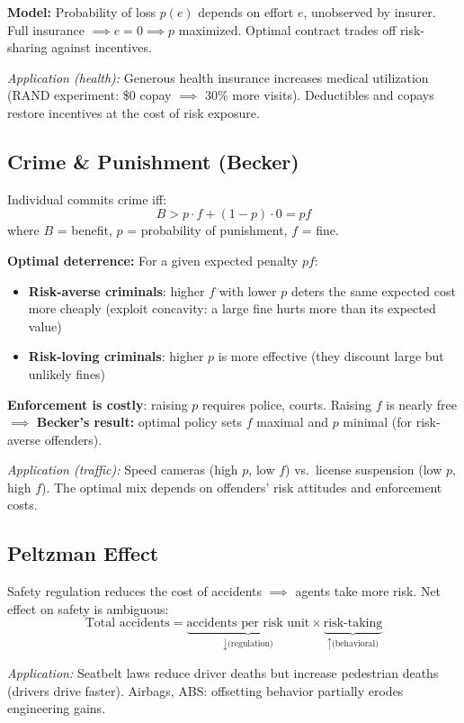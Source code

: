\textbf{Model:} Probability of loss $p(e)$ depends on effort $e$, unobserved by insurer. Full insurance $\implies e = 0 \implies p$ maximized. Optimal contract trades off risk-sharing against incentives.

\textit{Application (health):} Generous health insurance increases medical utilization (RAND experiment: \$0 copay $\implies$ 30\% more visits). Deductibles and copays restore incentives at the cost of risk exposure.

\subsection{Crime \& Punishment (Becker)}
Individual commits crime iff:
$$B > p \cdot f + (1-p) \cdot 0 = pf$$
where $B$ = benefit, $p$ = probability of punishment, $f$ = fine.

\textbf{Optimal deterrence:} For a given expected penalty $pf$:
\begin{itemize}[nosep]
  \item \textbf{Risk-averse criminals}: higher $f$ with lower $p$ deters the same expected cost more cheaply (exploit concavity: a large fine hurts more than its expected value)
  \item \textbf{Risk-loving criminals}: higher $p$ is more effective (they discount large but unlikely fines)
\end{itemize}
\textbf{Enforcement is costly}: raising $p$ requires police, courts. Raising $f$ is nearly free $\implies$ \textbf{Becker's result:} optimal policy sets $f$ maximal and $p$ minimal (for risk-averse offenders).

\textit{Application (traffic):} Speed cameras (high $p$, low $f$) vs.\ license suspension (low $p$, high $f$). The optimal mix depends on offenders' risk attitudes and enforcement costs.

\subsection{Peltzman Effect}
Safety regulation reduces the cost of accidents $\implies$ agents take more risk. Net effect on safety is ambiguous:
$$\text{Total accidents} = \underbrace{\text{accidents per risk unit}}_{\downarrow \text{(regulation)}} \times \underbrace{\text{risk-taking}}_{\uparrow \text{(behavioral)}}$$

\textit{Application:} Seatbelt laws reduce driver deaths but increase pedestrian deaths (drivers drive faster). Airbags, ABS: offsetting behavior partially erodes engineering gains.

